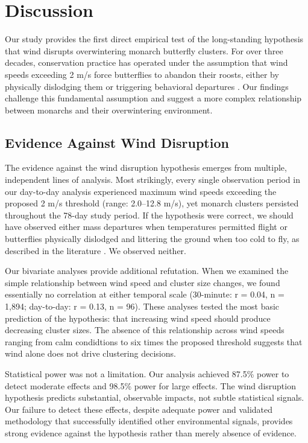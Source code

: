 \section{Discussion}

Our study provides the first direct empirical test of the long-standing hypothesis that wind disrupts overwintering monarch butterfly clusters. For over three decades, conservation practice has operated under the assumption that wind speeds exceeding 2 m/s force butterflies to abandon their roosts, either by physically dislodging them or triggering behavioral departures \parencite{leongEvaluatingManagementCalifornia2016}. Our findings challenge this fundamental assumption and suggest a more complex relationship between monarchs and their overwintering environment.

\subsection{Evidence Against Wind Disruption}

The evidence against the wind disruption hypothesis emerges from multiple, independent lines of analysis. Most strikingly, every single observation period in our day-to-day analysis experienced maximum wind speeds exceeding the proposed 2 m/s threshold (range: 2.0--12.8 m/s), yet monarch clusters persisted throughout the 78-day study period. If the hypothesis were correct, we should have observed either mass departures when temperatures permitted flight or butterflies physically dislodged and littering the ground when too cold to fly, as described in the literature \parencite{leongRestorationOverwinteringGrove1999}. We observed neither.

Our bivariate analyses provide additional refutation. When we examined the simple relationship between wind speed and cluster size changes, we found essentially no correlation at either temporal scale (30-minute: r = 0.04, n = 1,894; day-to-day: r = 0.13, n = 96). These analyses tested the most basic prediction of the hypothesis: that increasing wind speed should produce decreasing cluster sizes. The absence of this relationship across wind speeds ranging from calm condidtions to six times the proposed threshold suggests that wind alone does not drive clustering decisions.

Statistical power was not a limitation. Our analysis achieved 87.5\% power to detect moderate effects and 98.5\% power for large effects. The wind disruption hypothesis predicts substantial, observable impacts, not subtle statistical signals. Our failure to detect these effects, despite adequate power and validated methodology that successfully identified other environmental signals, provides strong evidence against the hypothesis rather than merely absence of evidence.

